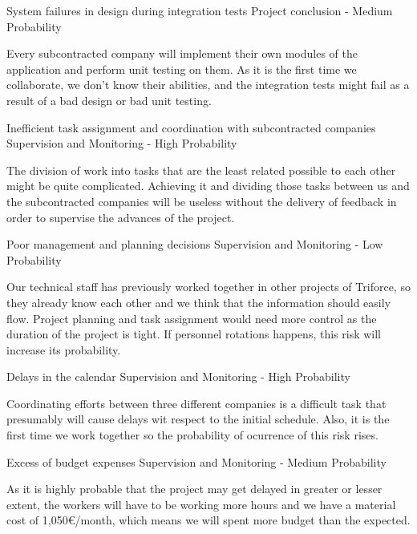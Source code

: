 \begin{risk}[riskIntegrationTests]{System failures in design during integration tests}
\riskcat Project conclusion
 - Medium Probability

Every subcontracted company will implement their own modules of the application and perform unit testing on them. As it is the first time we collaborate, we don't know their abilities, and the integration tests might fail as a result of a bad design or bad unit testing.
\end{risk}

\begin{risk}[riskAssignment]{Inefficient task assignment and coordination with subcontracted companies}
\riskcat Supervision and Monitoring
 - High Probability

The division of work into tasks that are the least related possible to each other might be quite complicated. Achieving it and dividing those tasks between us and the subcontracted companies will be useless without the delivery of feedback in order to supervise the advances of the project.
\end{risk}

\begin{risk}[riskManagement]{Poor management and planning decisions}
\riskcat Supervision and Monitoring
 - Low Probability

Our technical staff has previously worked together in other projects of Triforce, so they already know each other and we think that the information should easily flow. Project planning and task assignment would need more control as the duration of the project is tight. If personnel rotations happens, this risk will increase its probability.
\end{risk}

\begin{risk}[riskDelays]{Delays in the calendar}
\riskcat Supervision and Monitoring
 - High Probability

Coordinating efforts between three different companies is a difficult task that presumably will cause delays wit respect to the initial schedule. Also, it is the first time we work together so the probability of ocurrence of this risk rises.
\end{risk}

\begin{risk}[riskBudget]{Excess of budget expenses}
\riskcat Supervision and Monitoring
 - Medium Probability

As it is highly probable that the project may get delayed in greater or lesser extent, the workers will have to be working more hours and we have a material cost of 1,050\euro/month, which means we will spent more budget than the expected.
\end{risk}

